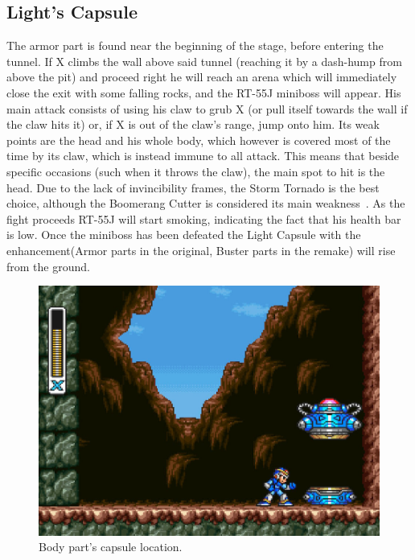 \subsection{Light's Capsule}
The armor part is found near the beginning of the stage, before entering the tunnel. If X climbs the wall above said tunnel (reaching it by a dash-hump from above the pit) and proceed right he will reach an arena which will immediately close the exit with some falling rocks, and the RT-55J miniboss will appear. His main attack consists of using his claw to grub X (or pull itself towards the wall if the claw hits it) or, if X is out of the claw's range, jump onto him. Its weak points are the head and his whole body, which however is covered most of the time by its claw, which is instead immune to all attack. This means that beside specific occasions (such when it throws the claw), the main spot to hit is the head. Due to the lack of invincibility frames, the Storm Tornado is the best choice, although the Boomerang Cutter is considered its main weakness~\cite{wiki:RT55J}. As the fight proceeds RT-55J will start smoking, indicating the fact that his health bar is low. Once the miniboss has been defeated the Light Capsule with the enhancement(Armor parts in the original, Buster parts in the remake) will rise from the ground.
\begin{figure}[htp]
	\centering
	\includegraphics[width=0.5\linewidth]{figures/X1/Sting_chameleon/Sting_armor_capsule.jpg}
	\caption{Body part's capsule location.}
\end{figure}

